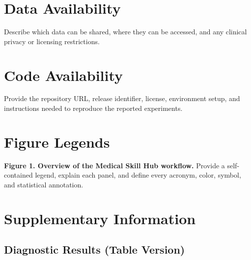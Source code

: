 \documentclass[10pt,letterpaper]{article}
\begin{document}
\section{Data Availability}

Describe which data can be shared, where they can be accessed, and any clinical
privacy or licensing restrictions.

\section{Code Availability}

Provide the repository URL, release identifier, license, environment setup, and
instructions needed to reproduce the reported experiments.

\printbibliography[title={References}]

\section{Figure Legends}

\textbf{Figure 1. Overview of the Medical Skill Hub workflow.}
Provide a self-contained legend, explain each panel, and define every acronym,
color, symbol, and statistical annotation.

\clearpage
\appendix
\section{Supplementary Information}

\subsection{Diagnostic Results (Table Version)}
\end{document}
